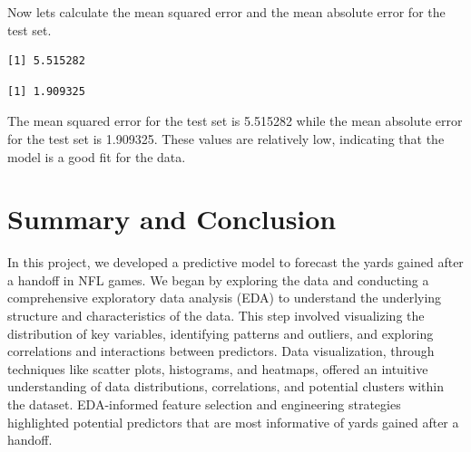 \documentclass[
  super,
  preprint,
  3p]{elsarticle}
\newenvironment{Shaded}{\begin{snugshade}}{\end{snugshade}}
\newcommand{\CommentTok}[1]{\textcolor[rgb]{0.37,0.37,0.37}{#1}}
\newcommand{\DecValTok}[1]{\textcolor[rgb]{0.68,0.00,0.00}{#1}}
\newcommand{\FunctionTok}[1]{\textcolor[rgb]{0.28,0.35,0.67}{#1}}
\newcommand{\NormalTok}[1]{\textcolor[rgb]{0.00,0.23,0.31}{#1}}
\newcommand{\OtherTok}[1]{\textcolor[rgb]{0.00,0.23,0.31}{#1}}
\newcommand{\SpecialCharTok}[1]{\textcolor[rgb]{0.37,0.37,0.37}{#1}}
\begin{document}
Now lets calculate the mean squared error and the mean absolute error
for the test set.

\begin{Shaded}
\end{Shaded}

\begin{verbatim}
[1] 5.515282
\end{verbatim}

\begin{Shaded}
\end{Shaded}

\begin{verbatim}
[1] 1.909325
\end{verbatim}

The mean squared error for the test set is 5.515282 while the mean
absolute error for the test set is 1.909325. These values are relatively
low, indicating that the model is a good fit for the data.

\hypertarget{summary-and-conclusion}{%
\section{Summary and Conclusion}\label{summary-and-conclusion}}

In this project, we developed a predictive model to forecast the yards
gained after a handoff in NFL games. We began by exploring the data and
conducting a comprehensive exploratory data analysis (EDA) to understand
the underlying structure and characteristics of the data. This step
involved visualizing the distribution of key variables, identifying
patterns and outliers, and exploring correlations and interactions
between predictors. Data visualization, through techniques like scatter
plots, histograms, and heatmaps, offered an intuitive understanding of
data distributions, correlations, and potential clusters within the
dataset. EDA-informed feature selection and engineering strategies
highlighted potential predictors that are most informative of yards
gained after a handoff.
\end{document}
